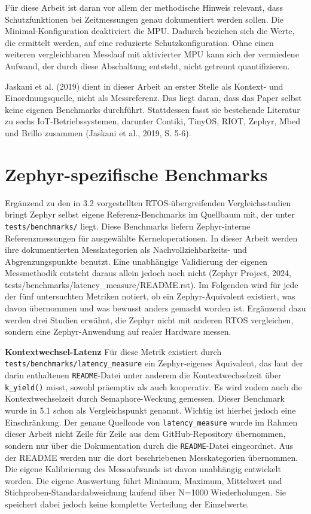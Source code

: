 Für diese Arbeit ist daran vor allem der methodische Hinweis relevant, dass Schutzfunktionen bei Zeitmessungen genau dokumentiert werden sollen. Die Minimal-Konfiguration deaktiviert die MPU. Dadurch beziehen sich die Werte, die ermittelt werden, auf eine reduzierte Schutzkonfiguration. Ohne einen weiteren vergleichbaren Messlauf mit aktivierter MPU kann sich der vermiedene Aufwand, der durch diese Abschaltung entsteht, nicht getrennt quantifizieren.

Jaskani et al. (2019) dient in dieser Arbeit an erster Stelle als Kontext- und Einordnungsquelle, nicht als Messreferenz. Das liegt daran, dass das Paper selbst keine eigenen Benchmarks durchführt. Stattdessen fasst sie bestehende Literatur zu sechs IoT-Betriebssystemen, darunter Contiki, TinyOS, RIOT, Zephyr, Mbed und Brillo zusammen (Jaskani et al., 2019, S. 5-6).

\section{Zephyr-spezifische Benchmarks}
Ergänzend zu den in 3.2 vorgestellten RTOS-übergreifenden Vergleichsstudien bringt Zephyr selbst eigene Referenz-Benchmarks im Quellbaum mit, der unter \lstinline[style=fileinline]|tests/benchmarks/| liegt. Diese Benchmarks liefern Zephyr-interne Referenzmessungen für ausgewählte Kerneloperationen. In dieser Arbeit werden ihre dokumentierten Messkategorien als Nachvollziehbarkeits- und Abgrenzungspunkte benutzt. Eine unabhängige Validierung der eigenen Messmethodik entsteht daraus allein jedoch noch nicht (Zephyr Project, 2024, tests/benchmarks/latency\_measure/README.rst). Im Folgenden wird für jede der fünf untersuchten Metriken notiert, ob ein Zephyr-Äquivalent existiert, was davon übernommen und was bewusst anders gemacht worden ist. Ergänzend dazu werden drei Studien erwähnt, die Zephyr nicht mit anderen RTOS vergleichen, sondern eine Zephyr-Anwendung auf realer Hardware messen.

\textbf{Kontextwechsel-Latenz }Für diese Metrik existiert durch \lstinline[style=fileinline]|tests/benchmarks/latency_measure| ein Zephyr-eigenes Äquivalent, das laut der darin enthaltenen \lstinline[style=fileinline]|README|-Datei unter anderem die Kontextwechselzeit über \lstinline[style=fileinline]|k_yield()| misst, sowohl präemptiv als auch kooperativ. Es wird zudem auch die Kontextwechselzeit durch Semaphore-Weckung gemessen. Dieser Benchmark wurde in 5.1 schon als Vergleichspunkt genannt. Wichtig ist hierbei jedoch eine Einschränkung. Der genaue Quellcode von \lstinline[style=fileinline]|latency_measure| wurde im Rahmen dieser Arbeit nicht Zeile für Zeile aus dem GitHub-Repository übernommen, sondern nur über die Dokumentation durch die \lstinline[style=fileinline]|README|-Datei eingeordnet. Aus der README werden nur die dort beschriebenen Messkategorien übernommen. Die eigene Kalibrierung des Messaufwands ist davon unabhängig entwickelt worden. Die eigene Auswertung führt Minimum, Maximum, Mittelwert und Stichproben-Standardabweichung laufend über N=1000 Wiederholungen. Sie speichert dabei jedoch keine komplette Verteilung der Einzelwerte.


